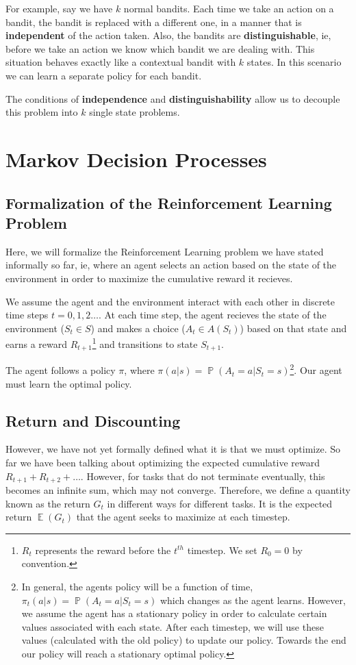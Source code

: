 \documentclass[12pt]{report}
\begin{document}
For example, say we have $k$ normal bandits. Each time we take an action on a bandit, the bandit is replaced with a different one, in a manner that is \textbf{independent} of the action taken. Also, the bandits are \textbf{distinguishable}, 
ie, before we take an action we know which bandit we are dealing with. This situation behaves exactly like a contextual bandit with $k$ states. In this scenario we can learn a separate policy for each bandit.

The conditions of \textbf{independence} and \textbf{distinguishability} allow us to decouple this problem into $k$ single state problems.

\chapter{Markov Decision Processes}
\section{Formalization of the Reinforcement Learning Problem}
Here, we will formalize the Reinforcement Learning problem we have stated informally so far, ie, where an agent selects an action based on the state of the environment in order to maximize the cumulative reward it recieves.

We assume the agent and the environment interact with each other in discrete time steps $t = 0, 1, 2 \dots$. At each time step, the agent recieves the state of the environment ($S_{t} \in S$) and makes a choice ($A_{t} \in A(S_{t})$) based on that state 
and earns a reward $R_{t + 1}$\footnote{$R_{t}$ represents the reward before the $t^{th}$ timestep. We set $R_{0} = 0$ by convention.} and transitions to state $S_{t + 1}$. 

The agent follows a policy $\pi$, where $\pi(a | s) = \mathop{\mathbb{P}}(A_{t} = a | S_{t} = s)$\footnote{In general, the agents policy will be a function of time, $\pi_{t}(a | s) = \mathop{\mathbb{P}}(A_{t} = a | S_{t} = s)$ which changes as the agent learns. However, we assume the agent 
has a stationary policy in order to calculate certain values associated with each state. After each timestep, we will use these values (calculated with the old policy) to update our policy. Towards the end our policy will reach a stationary optimal policy.}. Our agent must learn the optimal policy.

\section{Return and Discounting}
However, we have not yet formally defined what it is that we must optimize. So far we have been talking about optimizing the expected cumulative reward $R_{t + 1} + R_{t + 2} + \dots$. However, for tasks that do not terminate eventually, this becomes an infinite sum, which may not converge.
Therefore, we define a quantity known as the return $G_{t}$ in different ways for different tasks. It is the expected return $\mathop{\mathbb{E}}(G_{t})$ that the agent seeks to maximize at each timestep.
\end{document}
